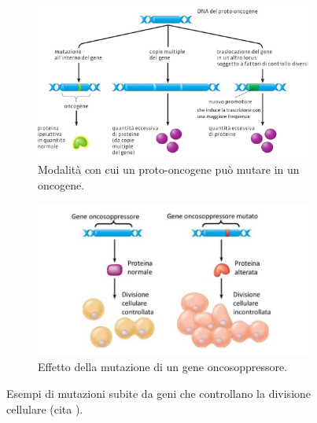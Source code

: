\documentclass[12pt,a4paper,twoside]{report}
\begin{document}
	\begin{figure}[H]
		\centering
		\begin{subfigure}[b]{0.9\textwidth}
			\centering
			\includegraphics[width=\textwidth, scale=0.5]{images/oncogene.png}
			\caption{Modalità con cui un proto-oncogene può mutare in un oncogene.}
			\label{fig:oncogene}
		\end{subfigure}
		\par
		\begin{subfigure}[b]{0.9\textwidth}
			\centering
			\includegraphics[width=\textwidth, scale=0.5]{images/oncosoppressore.jpg}
			\caption{Effetto della mutazione di un gene oncosoppressore.}
			\label{fig:oncosoppressore}
		\end{subfigure}
		\caption{Esempi di mutazioni subite da geni che controllano la divisione cellulare (cita
			).}
		\label{fig:mutazioni_genetiche}
	\end{figure}
	
\end{document}
